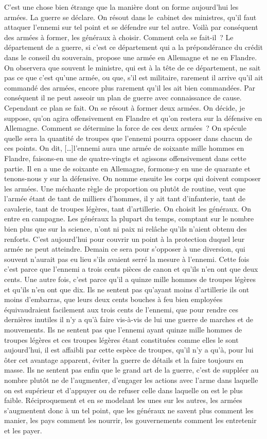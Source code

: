 \documentclass[french,twoside]{book} %
\begin{document}
C’est une chose bien étrange que la manière dont on forme aujourd’hui les armées. La guerre se déclare. On résout dans le cabinet des ministres, qu’il faut attaquer l’ennemi sur tel point et se défendre sur tel autre. Voilà par conséquent des armées à former, les généraux à choisir. Comment cela se fait-il ? Le département de a guerre, si c’est ce département qui a la prépondérance du crédit dans le conseil du souverain, propose une armée en Allemagne et ne en Flandre. On observera que souvent le ministre, qui est à la tête de ce département, ne sait pas ce que c’est qu’une armée, ou que, s’il est militaire, rarement il arrive qu’il ait commandé des armées, encore plus rarement qu’il les ait bien commandées. Par conséquent il ne peut asseoir un plan de guerre avec connaissance de cause. Cependant ce plan se fait. On se résout à former deux armées. On décide, je suppose, qu’on agira offensivement en Flandre et qu’on restera sur la défensive en Allemagne. Comment se détermine la force de ces deux armées ? On spécule quelle sera la quantité de troupes que l’ennemi pourra opposer dans chacun de ces points. On dit, […]l’ennemi aura une armée de soixante mille hommes en Flandre, faisons-en une de quatre-vingts et agissons offensivement dans cette partie. Il en a une de soixante en Allemagne, formons-y en une de quarante et tenons-nous y sur la défensive. On nomme ensuite les corps qui doivent composer les armées. Une méchante règle de proportion ou plutôt de routine, veut que l’armée étant de tant de milliers d’hommes, il y ait tant d’infanterie, tant de cavalerie, tant de troupes légères, tant d’artillerie. On choisit les généraux. On entre en campagne. Les généraux la plupart du temps, comptant sur le nombre bien plus que sur la science, n’ont ni paix ni relâche qu’ils n’aient obtenu des renforts. C’est aujourd’hui pour couvrir un point à la protection duquel leur armée ne peut atteindre. Demain ce sera pour s’opposer à une diversion, qui souvent n’aurait pas eu lieu s’ils avaient serré la mesure à l’ennemi. Cette fois c’est parce que l’ennemi a trois cents pièces de canon et qu’ils n’en ont que deux cents. Une autre fois, c’est parce qu’il a quinze mille hommes de troupes légères et qu’ils n’en ont que dix. Ils ne sentent pas qu’ayant moins d’artillerie ils ont moins d’embarras, que leurs deux cents bouches à feu bien employées équivaudraient facilement aux trois cents de l’ennemi, que pour rendre ces dernières inutiles il n’y a qu’à faire vis-à-vis de lui une guerre de marches et de mouvements. Ils ne sentent pas que l’ennemi ayant quinze mille hommes de troupes légères et ces troupes légères étant constituées comme elles le sont aujourd’hui, il est affaibli par cette espèce de troupes, qu’il n’y a qu’à, pour lui ôter cet avantage apparent, éviter la guerre de détails et la faire toujours en masse. Ils ne sentent pas enfin que le grand art de la guerre, c’est de suppléer au nombre plutôt ne de l’augmenter, d’engager les actions avec l’arme dans laquelle on est supérieur et d’appuyer ou de refuser celle dans laquelle on est le plus faible. Réciproquement et en se modelant les unes sur les autres, les armées s’augmentent donc à un tel point, que les généraux ne savent plus comment les manier, les pays comment les nourrir, les gouvernements comment les entretenir et les payer. 
\end{document}
